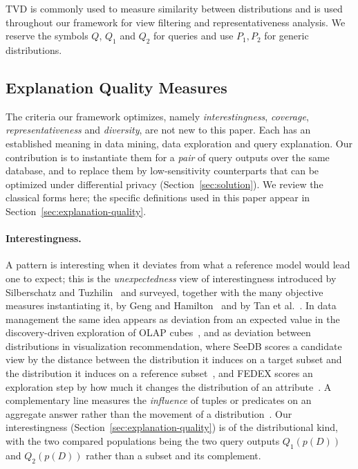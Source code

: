 TVD is commonly used to measure similarity between distributions and is used
throughout our framework for view filtering and representativeness analysis.
We reserve the symbols $Q$, $Q_1$ and $Q_2$ for queries and use $P_1,P_2$ for
generic distributions.

\subsection{Explanation Quality Measures}
\label{subsec:prelim-quality}

The criteria our framework optimizes, namely \emph{interestingness},
\emph{coverage}, \emph{representativeness} and \emph{diversity}, are not new to
this paper.
Each has an established meaning in data mining, data exploration and query
explanation.
Our contribution is to instantiate them for a \emph{pair} of query outputs over the
same database, and to replace them by low-sensitivity counterparts that can be
optimized under differential privacy (Section~\ref{sec:solution}).
We review the classical forms here; the specific definitions used in this paper
appear in Section~\ref{sec:explanation-quality}.

\paragraph{Interestingness.}
A pattern is interesting when it deviates from what a reference model would lead one
to expect; this is the \emph{unexpectedness} view of interestingness introduced by
Silberschatz and Tuzhilin~\cite{SilberschatzT96} and surveyed, together with the
many objective measures instantiating it, by Geng and
Hamilton~\cite{GengHamilton06} and by Tan et al.~\cite{TanKS02}.
In data management the same idea appears as deviation from an expected value in the
discovery-driven exploration of OLAP cubes~\cite{Sarawagi98}, and as
deviation between distributions in visualization recommendation, where SeeDB scores a
candidate view by the distance between the distribution it induces on a target
subset and the distribution it induces on a reference subset~\cite{SeeDB}, and
FEDEX scores an exploration step by how much it changes the distribution of an
attribute~\cite{FEDEX}.
A complementary line measures the \emph{influence} of tuples or predicates on an
aggregate answer rather than the movement of a distribution~\cite{wu2013,RoyS14}.
Our interestingness (Section~\ref{sec:explanation-quality}) is of the
distributional kind, with the two compared populations being the two query outputs
$Q_1(p(D))$ and $Q_2(p(D))$ rather than a subset and its complement.


